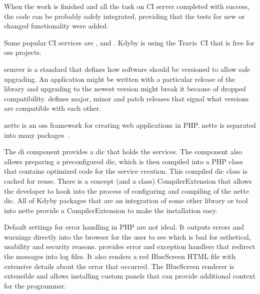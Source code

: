 When the work is finished and all the task on CI server completed with success, the code can be probably safely integrated, providing that the tests for new or changed functionality were added.

Some popular CI services are ,  and . Kdyby is using the Travis~CI that is free for \gls{oss} projects.

 \label{sec:theory:semver}

\gls{semver} is a standard that defines how software should be versioned to allow safe upgrading. An application might be written with a particular release of the library and upgrading to the newest version might break it because of dropped compatibility.  defines major, minor and patch releases that signal what versions are compatible with each other.

 \label{sec:theory:nette}

\gls{nette} is an \gls{oss} framework for creating web applications in PHP. \gls{nette} is separated into many packages~\cite{nette:introduction}.

The \gls{di} component  provides a \gls{dic} that holds the services. The component also allows preparing a preconfigured \gls{dic}, which is then compiled into a PHP class that contains optimized code for the service creation. This compiled \gls{dic} class is cached for reuse. There is a concept (and a class) CompilerExtension that allows the developer to hook into the process of configuring and compiling of the \gls{nette} \gls{dic}. All of Kdyby packages that are an integration of some other library or tool into \gls{nette} provide a CompilerExtension to make the installation easy.

Default settings for error handling in PHP are not ideal. It outputs errors and warnings directly into the browser for the user to see which is bad for esthetical, usability and security reasons.  provides error and exception handlers that redirect the messages into log files. It also renders a red BlueScreen HTML file with extensive details about the error that occurred. The BlueScreen renderer is extensible and allows installing custom panels that can provide additional context for the programmer.


